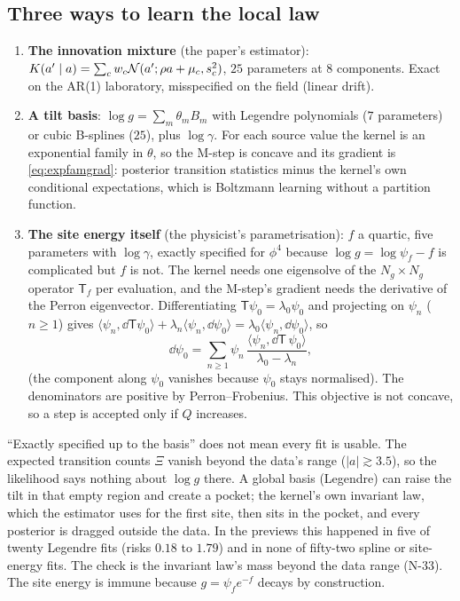 \subsection{Three ways to learn the local law}

\begin{enumerate}
\item \textbf{The innovation mixture} (the paper's estimator): $K(a'\mid a)=\sum_cw_c\mathcal{N}(a';\rho a+\mu_c,s_c^2)$, $25$ parameters at
  $8$ components. Exact on the AR(1) laboratory, misspecified on the field (linear drift).
\item \textbf{A tilt basis}: $\log g=\sum_m\theta_mB_m$ with Legendre polynomials ($7$ parameters) or cubic B-splines ($25$),
  plus $\log\gamma$. For each source value the kernel is an exponential family in $\theta$, so the M-step is concave and its
  gradient is \eqref{eq:expfamgrad}: posterior transition statistics minus the kernel's own conditional expectations,
  which is Boltzmann learning without a partition function.
\item \textbf{The site energy itself} (the physicist's parametrisation): $f$ a quartic, five parameters with $\log\gamma$,
  exactly specified for $\phi^4$ because $\log g=\log\psi_f-f$ is complicated but $f$ is not. The kernel needs one
  eigensolve of the $N_g\times N_g$ operator $\mathsf T_f$ per evaluation, and the M-step's gradient needs the derivative of the
  Perron eigenvector. Differentiating $\mathsf T\psi_0=\lambda_0\psi_0$ and projecting on $\psi_n$ ($n\ge1$) gives
  $\langle\psi_n,\dd\mathsf T\psi_0\rangle+\lambda_n\langle\psi_n,\dd\psi_0\rangle=\lambda_0\langle\psi_n,\dd\psi_0\rangle$, so
  \[
    \dd\psi_0=\sum_{n\ge1}\psi_n\,\frac{\langle\psi_n,\dd\mathsf T\,\psi_0\rangle}{\lambda_0-\lambda_n},
  \]
  (the component along $\psi_0$ vanishes because $\psi_0$ stays normalised). The denominators are positive by
  Perron--Frobenius. This objective is not concave, so a step is accepted only if $Q$ increases.
\end{enumerate}

\begin{caution}
``Exactly specified up to the basis'' does not mean every fit is usable. The expected transition counts $\Xi$
vanish beyond the data's range ($|a|\gtrsim3.5$), so the likelihood says nothing about $\log g$ there. A global basis
(Legendre) can raise the tilt in that empty region and create a pocket; the kernel's own invariant law, which the
estimator uses for the first site, then sits in the pocket, and every posterior is dragged outside the data. In
the previews this happened in five of twenty Legendre fits (risks $0.18$ to $1.79$) and in none of fifty-two spline
or site-energy fits. The check is the invariant law's mass beyond the data range (N-33). The site energy is
immune because $g=\psi_fe^{-f}$ decays by construction.
\end{caution}

